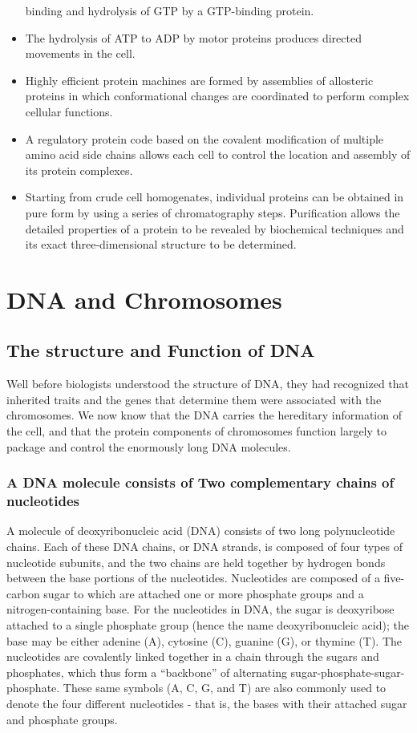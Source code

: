 \begin{itemize}
binding and hydrolysis of GTP by a GTP-binding protein.
\item The hydrolysis of ATP to ADP by motor proteins produces directed
movements in the cell.
\item Highly efficient protein machines are formed by assemblies of allosteric
proteins in which conformational changes are coordinated to
perform complex cellular functions.
\item A regulatory protein code based on the covalent modification of multiple
amino acid side chains allows each cell to control the location
and assembly of its protein complexes.
\item Starting from crude cell homogenates, individual proteins can be
obtained in pure form by using a series of chromatography steps.
Purification allows the detailed properties of a protein to be revealed
by biochemical techniques and its exact three-dimensional structure
to be determined.
\end{itemize}

\chapter{DNA and Chromosomes}

\section{The structure and Function of DNA}

Well before biologists understood the structure of DNA, they had recognized
that inherited traits and the genes that determine them were
associated with the chromosomes.
We now know that the DNA carries the hereditary information of the
cell, and that the protein components of chromosomes function largely
to package and control the enormously long DNA molecules.

\subsection{A DNA molecule consists of Two complementary chains of nucleotides}

A molecule of deoxyribonucleic acid (DNA) consists of two long polynucleotide
chains. Each of these DNA chains, or DNA strands, is composed
of four types of nucleotide subunits, and the two chains are held together
by hydrogen bonds between the base portions of the nucleotides.
Nucleotides are composed of a five-carbon sugar to which are attached one or more phosphate
groups and a nitrogen-containing base. For the nucleotides in DNA, the
sugar is deoxyribose attached to a single phosphate group (hence the
name deoxyribonucleic acid); the base may be either adenine (A), cytosine (C),
guanine (G), or thymine (T). The nucleotides are covalently linked
together in a chain through the sugars and phosphates, which thus form
a “backbone” of alternating sugar-phosphate-sugar-phosphate.
These same symbols (A, C, G, and T) are also commonly
used to denote the four different nucleotides - that is, the bases with their
attached sugar and phosphate groups.

